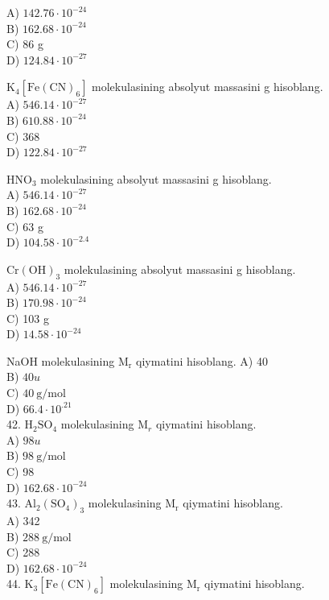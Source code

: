 A) $142.76 \cdot 10^{-24}$\\
B) $162.68 \cdot 10^{-24}$\\
C) 86 g\\
D) $124.84 \cdot 10^{-27}$
  \item $\mathrm{K}_{4}\left[\mathrm{Fe}(\mathrm{CN})_{6}\right]$ molekulasining absolyut massasini g hisoblang.\\
A) $546.14 \cdot 10^{-27}$\\
B) $610.88 \cdot 10^{-24}$\\
C) 368\\
D) $122.84 \cdot 10^{-27}$
  \item $\mathrm{HNO}_{3}$ molekulasining absolyut massasini g hisoblang.\\
A) $546.14 \cdot 10^{-27}$\\
B) $162.68 \cdot 10^{-24}$\\
C) 63 g\\
D) $104.58 \cdot 10^{-2.4}$
  \item $\mathrm{Cr}(\mathrm{OH})_{3}$ molekulasining absolyut massasini g hisoblang.\\
A) $546.14 \cdot 10^{-27}$\\
B) $170.98 \cdot 10^{-24}$\\
C) 103 g\\
D) $14.58 \cdot 10^{-24}$
  \item NaOH molekulasining $\mathrm{M}_{\mathrm{r}}$ qiymatini hisoblang.
A) 40\\
B) $40 u$\\
C) $40 \mathrm{~g} / \mathrm{mol}$\\
D) $66.4 \cdot 10^{.21}$\\
42. $\mathrm{H}_{2} \mathrm{SO}_{4}$ molekulasining $\mathrm{M}_{r}$ qiymatini hisoblang.\\
A) $98 u$\\
B) $98 \mathrm{~g} / \mathrm{mol}$\\
C) 98\\
D) $162.68 \cdot 10^{-24}$\\
43. $\mathrm{Al}_{2}\left(\mathrm{SO}_{4}\right)_{3}$ molekulasining $\mathrm{M}_{\mathrm{r}}$ qiymatini hisoblang.\\
A) 342\\
B) $288 \mathrm{~g} / \mathrm{mol}$\\
C) 288\\
D) $162.68 \cdot 10^{-24}$\\
44. $\mathrm{K}_{3}\left[\mathrm{Fe}(\mathrm{CN})_{6}\right]$ molekulasining $\mathrm{M}_{\mathrm{r}}$ qiymatini hisoblang.\\
